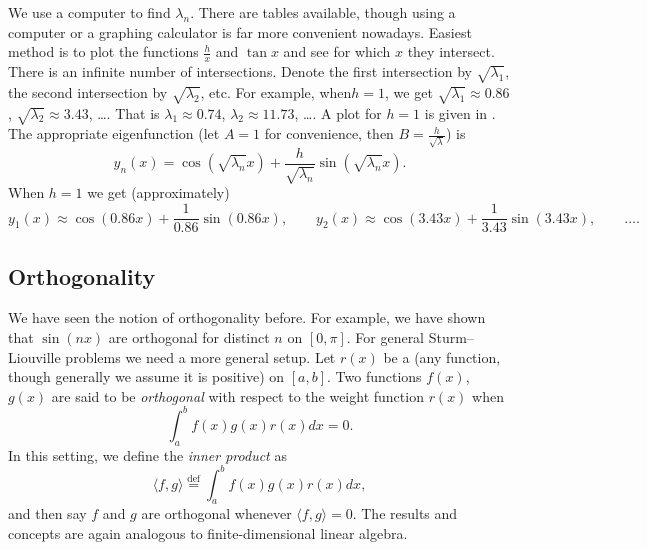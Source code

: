 \documentclass{ximera}
\begin{document}
\begin{example}
    We use a computer to find $\lambda_n$.  There are tables available, though using a computer or a graphing calculator is far more convenient nowadays. Easiest method is to plot the functions $\frac{h}{x}$ and $\tan x$ and see for which $x$ they intersect. There is an infinite number of intersections.  Denote the first intersection by $\sqrt{\lambda_1}$, the second intersection by $\sqrt{\lambda_2}$, etc. For example, when$h=1$, we get $\sqrt{\lambda_1} \approx 0.86$,  $\sqrt{\lambda_2} \approx 3.43$, \ldots. That is $\lambda_1 \approx 0.74$, $\lambda_2 \approx 11.73$, \ldots. A plot for $h=1$ is given in . The appropriate eigenfunction (let $A = 1$ for convenience, then $B=\frac{h}{\sqrt{\lambda}}$) is
    \begin{equation*}
        y_n(x) = \cos ( \sqrt{\lambda_n} x ) + \frac{h}{\sqrt{\lambda_n}} \sin (\sqrt{\lambda_n}  x ) .
    \end{equation*}
    When $h=1$ we get (approximately)
    \begin{equation*}
        y_1(x) \approx \cos (0.86 x ) + \frac{1}{0.86} \sin (0.86  x ) , \qquad
        y_2(x) \approx \cos (3.43 x ) + \frac{1}{3.43} \sin (3.43  x ) , \qquad \ldots .
    \end{equation*}
    \begin{myfig}
        \capstart
        \caption{Plot of $\frac{1}{x}$ and $\tan x$.%
        \label{sl:tanx1overxfig}}
    \end{myfig}
\end{example}

\subsection{Orthogonality}

We have seen the notion of orthogonality before.  For example, we have shown that $\sin (nx)$ are orthogonal for distinct $n$ on $[0,\pi]$. For general Sturm--Liouville problems we need a more general setup. Let $r(x)$ be a \emph{} (any function, though generally we assume it is positive) on $[a,b]$.  Two functions $f(x)$, $g(x)$ are said to be \emph{orthogonal} with respect to the weight function $r(x)$ when
\begin{equation*}
    \int_a^b f(x)  g(x)  r(x) dx = 0 .
\end{equation*}
In this setting, we define the \emph{inner product} as
\begin{equation*}
    \langle f , g \rangle \overset{\text{def}}{=} \int_a^b f(x)  g(x)  r(x) dx ,
\end{equation*}
and then say $f$ and $g$ are orthogonal whenever $\langle f , g \rangle = 0$. The results and concepts are again analogous to finite-dimensional linear algebra.
\end{document}
